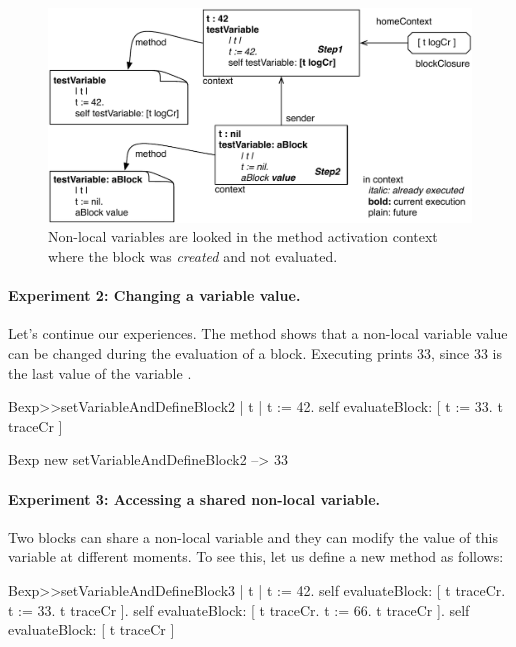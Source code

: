 \documentclass[a4paper,10pt,twoside]{book}
\begin{document}
\begin{figure}
\begin{center}\includegraphics[width=\textwidth]{variable}
\caption{Non-local variables are looked in the method activation context where the block was \emph{created} and not evaluated.\label{fig:variable}}
\end{center}
\end{figure}


\paragraph{Experiment 2: Changing a variable value.} Let's continue our experiences. The method  shows that a non-local variable value can be changed during the evaluation of a block. Executing  prints 33, since 33 is the last value of the variable .


\begin{code}{}
Bexp>>setVariableAndDefineBlock2
	| t |
	t := 42.
	self evaluateBlock: [ t := 33. t traceCr ]

Bexp new setVariableAndDefineBlock2	
	--> 33
\end{code}



\paragraph{Experiment 3: Accessing a shared non-local variable.}
Two blocks can share a non-local variable and they can modify the value of this variable at different moments. To see this, let us define a new method  as follows:

\begin{code}{}
Bexp>>setVariableAndDefineBlock3
	| t |
	t := 42.
	self evaluateBlock: [ t traceCr. t := 33. t traceCr ].
	self evaluateBlock: [ t traceCr. t := 66. t traceCr ].
	self evaluateBlock: [ t traceCr ]
\end{code}
\end{document}
